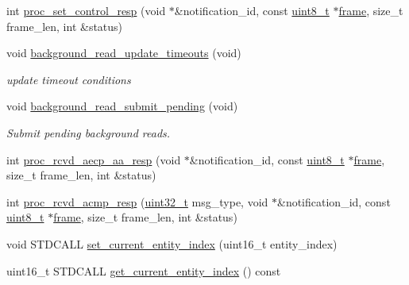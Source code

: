 \begin{DoxyCompactItemize}
\item 
int \hyperlink{classavdecc__lib_1_1end__station__imp_a5ec590aa701ab1dc91e3ef47df951d90}{proc\+\_\+set\+\_\+control\+\_\+resp} (void $\ast$\&notification\+\_\+id, const \hyperlink{stdint_8h_aba7bc1797add20fe3efdf37ced1182c5}{uint8\+\_\+t} $\ast$\hyperlink{gst__avb__playbin_8c_ac8e710e0b5e994c0545d75d69868c6f0}{frame}, size\+\_\+t frame\+\_\+len, int \&status)
\item 
void \hyperlink{classavdecc__lib_1_1end__station__imp_ae78309662403c0cba9c10e15f8f599b7}{background\+\_\+read\+\_\+update\+\_\+timeouts} (void)
\begin{DoxyCompactList}\small\item\em update timeout conditions \end{DoxyCompactList}\item 
void \hyperlink{classavdecc__lib_1_1end__station__imp_a54228a030840e7fbf8507265523c9b9c}{background\+\_\+read\+\_\+submit\+\_\+pending} (void)
\begin{DoxyCompactList}\small\item\em Submit pending background reads. \end{DoxyCompactList}\item 
int \hyperlink{classavdecc__lib_1_1end__station__imp_a2848ff48c874f56127a2bdc16f186010}{proc\+\_\+rcvd\+\_\+aecp\+\_\+aa\+\_\+resp} (void $\ast$\&notification\+\_\+id, const \hyperlink{stdint_8h_aba7bc1797add20fe3efdf37ced1182c5}{uint8\+\_\+t} $\ast$\hyperlink{gst__avb__playbin_8c_ac8e710e0b5e994c0545d75d69868c6f0}{frame}, size\+\_\+t frame\+\_\+len, int \&status)
\item 
int \hyperlink{classavdecc__lib_1_1end__station__imp_ae8100a9d8084dbe545f84b0aa14feaba}{proc\+\_\+rcvd\+\_\+acmp\+\_\+resp} (\hyperlink{parse_8c_a6eb1e68cc391dd753bc8ce896dbb8315}{uint32\+\_\+t} msg\+\_\+type, void $\ast$\&notification\+\_\+id, const \hyperlink{stdint_8h_aba7bc1797add20fe3efdf37ced1182c5}{uint8\+\_\+t} $\ast$\hyperlink{gst__avb__playbin_8c_ac8e710e0b5e994c0545d75d69868c6f0}{frame}, size\+\_\+t frame\+\_\+len, int \&status)
\item 
void S\+T\+D\+C\+A\+LL \hyperlink{classavdecc__lib_1_1end__station__imp_a743aff08ec6e9ed4d42e0dd550ab038f}{set\+\_\+current\+\_\+entity\+\_\+index} (uint16\+\_\+t entity\+\_\+index)
\item 
uint16\+\_\+t S\+T\+D\+C\+A\+LL \hyperlink{classavdecc__lib_1_1end__station__imp_aec8a7f4efb791dc076f7c78d5fd292f2}{get\+\_\+current\+\_\+entity\+\_\+index} () const 
\item 

\end{DoxyCompactItemize}
